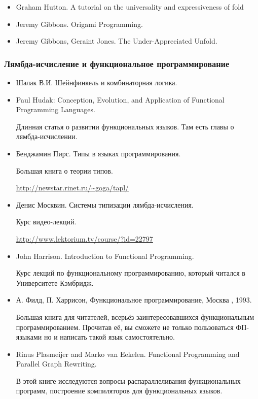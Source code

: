 \begin{itemize}
\item Graham Hutton. A tutorial on the universality
    and expressiveness of fold

\item Jeremy Gibbons. Origami Programming.

\item Jeremy Gibbons, Geraint Jones. The Under-Appreciated Unfold. 

\end{itemize}

\subsubsection{Лямбда-исчисление и функциональное программирование}

\begin{itemize}
\item Шалак В.И. Шейнфинкель и комбинаторная логика.
    
\item Paul Hudak: Conception, Evolution, and Application 
        of Functional Programming Languages.

      Длинная статья о развитии функциональных языков.
      Там есть главы о лямбда-исчислении. 

\item Бенджамин Пирс. Типы в языках программирования.

     Большая книга о теории типов. 

     \url{http://newstar.rinet.ru/~goga/tapl/}

\item Денис Москвин. Системы типизации лямбда-исчисления. 

    Курс видео-лекций.

    \url{http://www.lektorium.tv/course/?id=22797}

\item John Harrison. Introduction to Functional Programming.

    Курс лекций по функциональному программированию, который
    читался в Университете Кэмбридж.

\item А. Филд, П. Харрисон, Функциональное программирование,
    Москва , 1993. 

    Большая книга для читателей, всерьёз заинтересовавшихся
    функциональным программированием. Прочитав её, вы 
    сможете не только пользоваться ФП-языками но и написать 
    такой язык самостоятельно.

\item Rinus Plasmeijer and Marko van Eekelen. Functional Programming
    and Parallel Graph Rewriting.

    В этой книге исследуются вопросы распараллеливания
    функциональных программ, построение компиляторов для функциональных
    языков. 

\end{itemize}

